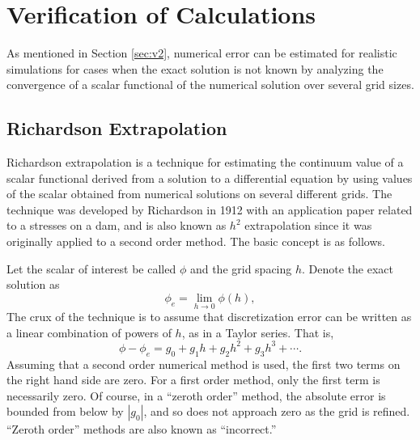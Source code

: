 \section{Verification of Calculations}
As mentioned in Section \ref{sec:v2}, numerical error can be estimated for realistic simulations for cases when the exact solution is not known by analyzing the convergence of a scalar functional of the numerical solution over several grid sizes.

\subsection{Richardson Extrapolation}
Richardson extrapolation is a technique for estimating the continuum value of a scalar functional derived from a solution to a differential equation by using values of the scalar obtained from numerical solutions on several different grids.
The technique was developed by Richardson in 1912 with an application paper related to a stresses on a dam, and is also known as $h^2$ extrapolation since it was originally applied to a second order method.
The basic concept is as follows.

Let the scalar of interest be called $\phi$ and the grid spacing $h$.
Denote the exact solution as
\begin{equation}
  \phi_e = \lim_{h \to 0} \phi(h),
\end{equation}
The crux of the technique is to assume that discretization error can be written as a linear combination of powers of $h$, as in a Taylor series.
That is,
\begin{equation}
  \phi - \phi_e = g_0 + g_1 h + g_2 h^2 + g_3 h^3 + \cdots.
\end{equation}
Assuming that a second order numerical method is used, the first two terms on the right hand side are zero.
For a first order method, only the first term is necessarily zero.
Of course, in a ``zeroth order'' method, the absolute error is bounded from below by $|g_0|$, and so does not approach zero as the grid is refined.
``Zeroth order'' methods are also known as ``incorrect.''

